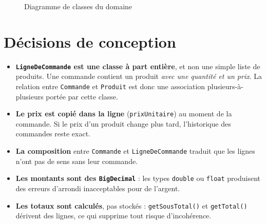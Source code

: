 \documentclass[11pt,a4paper]{report}
\begin{document}
\begin{figure}[H]
{
}
\caption{Diagramme de classes du domaine}\label{fig:classes}
\end{figure}

\section{D\'ecisions de conception}
\begin{itemize}
  \item \textbf{\texttt{LigneDeCommande} est une classe \`a part enti\`ere}, et non une simple liste de produits. Une commande contient un produit \emph{avec une quantit\'e et un prix}. La relation entre \texttt{Commande} et \texttt{Produit} est donc une association plusieurs-\`a-plusieurs port\'ee par cette classe.
  \item \textbf{Le prix est copi\'e dans la ligne} (\texttt{prixUnitaire}) au moment de la commande. Si le prix d'un produit change plus tard, l'historique des commandes reste exact.
  \item \textbf{La composition} entre \texttt{Commande} et \texttt{LigneDeCommande} traduit que les lignes n'ont pas de sens sans leur commande.
  \item \textbf{Les montants sont des \texttt{BigDecimal}} : les types \texttt{double} ou \texttt{float} produisent des erreurs d'arrondi inacceptables pour de l'argent.
  \item \textbf{Les totaux sont calcul\'es}, pas stock\'es : \texttt{getSousTotal()} et \texttt{getTotal()} d\'erivent des lignes, ce qui supprime tout risque d'incoh\'erence.
\end{itemize}
\end{document}
